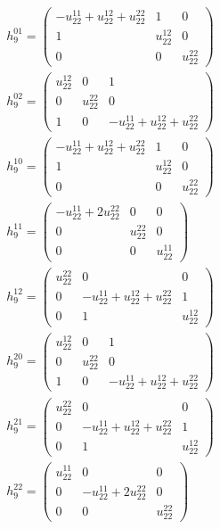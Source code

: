 \documentclass[a4paper, 11pt, twoside, onecolumn]{article}
\begin{document}
\begin{landscape}
\begin{gather*}
	 h_9^{01}=\begin{pmatrix}- u^{11}_{22} + u^{12}_{22} + u^{22}_{22} & 1 & 0\\1 & u^{12}_{22} & 0\\0 & 0 & u^{22}_{22}\end{pmatrix}\\ 
	 h_9^{02}=\begin{pmatrix}u^{12}_{22} & 0 & 1\\0 & u^{22}_{22} & 0\\1 & 0 & - u^{11}_{22} + u^{12}_{22} + u^{22}_{22}\end{pmatrix}\\ 
	 h_9^{10}=\begin{pmatrix}- u^{11}_{22} + u^{12}_{22} + u^{22}_{22} & 1 & 0\\1 & u^{12}_{22} & 0\\0 & 0 & u^{22}_{22}\end{pmatrix}\\ 
	 h_9^{11}=\begin{pmatrix}- u^{11}_{22} + 2 u^{22}_{22} & 0 & 0\\0 & u^{22}_{22} & 0\\0 & 0 & u^{11}_{22}\end{pmatrix}\\ 
	 h_9^{12}=\begin{pmatrix}u^{22}_{22} & 0 & 0\\0 & - u^{11}_{22} + u^{12}_{22} + u^{22}_{22} & 1\\0 & 1 & u^{12}_{22}\end{pmatrix}\\ 
	 h_9^{20}=\begin{pmatrix}u^{12}_{22} & 0 & 1\\0 & u^{22}_{22} & 0\\1 & 0 & - u^{11}_{22} + u^{12}_{22} + u^{22}_{22}\end{pmatrix}\\ 
	 h_9^{21}=\begin{pmatrix}u^{22}_{22} & 0 & 0\\0 & - u^{11}_{22} + u^{12}_{22} + u^{22}_{22} & 1\\0 & 1 & u^{12}_{22}\end{pmatrix}\\ 
	 h_9^{22}=\begin{pmatrix}u^{11}_{22} & 0 & 0\\0 & - u^{11}_{22} + 2 u^{22}_{22} & 0\\0 & 0 & u^{22}_{22}\end{pmatrix}\\ 

\end{gather*}
\end{landscape}
\end{document}
